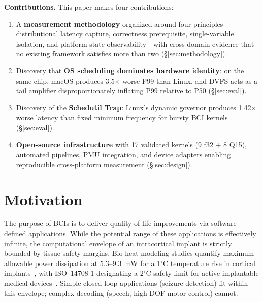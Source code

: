 \documentclass[sigplan,10pt]{acmart}
\begin{document}
\textbf{Contributions.} This paper makes four contributions:
\begin{enumerate}
    \item A \textbf{measurement methodology} organized around four principles---distributional latency capture, correctness prerequisite, single-variable isolation, and platform-state observability---with cross-domain evidence that no existing framework satisfies more than two (\S\ref{sec:methodology}).
    \item Discovery that \textbf{OS scheduling dominates hardware identity}: on the same chip, macOS produces 3.5$\times$ worse P99 than Linux, and DVFS acts as a tail amplifier disproportionately inflating P99 relative to P50 (\S\ref{sec:eval}).
    \item Discovery of the \textbf{Schedutil Trap}: Linux's dynamic governor produces 1.42$\times$ worse latency than fixed minimum frequency for bursty BCI kernels (\S\ref{sec:eval}).
    \item \textbf{Open-source infrastructure} with 17 validated kernels (9 f32 + 8 Q15), automated pipelines, PMU integration, and device adapters enabling reproducible cross-platform measurement (\S\ref{sec:design}).
\end{enumerate}


\section{Motivation}
\label{sec:motivation}

The purpose of BCIs is to deliver quality-of-life improvements via software-defined applications. While the potential range of these applications is effectively infinite, the computational envelope of an intracortical implant is strictly bounded by tissue safety margins. Bio-heat modeling studies quantify maximum allowable power dissipation at 5.3--9.3~mW for a 1$^\circ$C temperature rise in cortical implants~\cite{silay2008thermal}, with ISO~14708-1 designating a 2$^\circ$C safety limit for active implantable medical devices~\cite{whalen2023thermal}. Simple closed-loop applications (seizure detection) fit within this envelope; complex decoding (speech, high-DOF motor control) cannot.
\end{document}
